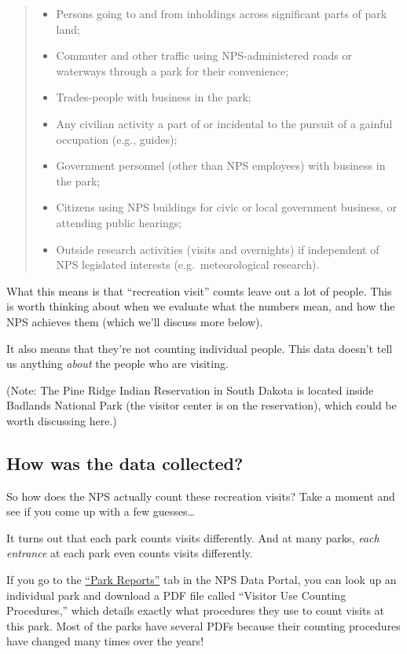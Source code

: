 \documentclass[
  letterpaper,
  DIV=11,
  numbers=noendperiod]{scrartcl}
\providecommand{\tightlist}{%
  \setlength{\itemsep}{0pt}\setlength{\parskip}{0pt}}\usepackage{longtable,booktabs,array}
\begin{document}
\begin{quote}
\begin{itemize}
\tightlist
\item
  Persons going to and from inholdings across significant parts of park
  land;
\item
  Commuter and other traffic using NPS-administered roads or waterways
  through a park for their convenience;
\item
  Trades-people with business in the park;
\item
  Any civilian activity a part of or incidental to the pursuit of a
  gainful occupation (e.g., guides);
\item
  Government personnel (other than NPS employees) with business in the
  park;
\item
  Citizens using NPS buildings for civic or local government business,
  or attending public hearings;
\item
  Outside research activities (visits and overnights) if independent of
  NPS legislated interests (e.g.~meteorological research).
\end{itemize}
\end{quote}

What this means is that ``recreation visit'' counts leave out a lot of
people. This is worth thinking about when we evaluate what the numbers
mean, and how the NPS achieves them (which we'll discuss more below).

It also means that they're not counting individual people. This data
doesn't tell us anything \emph{about} the people who are visiting.

(Note: The Pine Ridge Indian Reservation in South Dakota is located
inside Badlands National Park (the visitor center is on the
reservation), which could be worth discussing here.)

\subsection{How was the data
collected?}\label{how-was-the-data-collected}

So how does the NPS actually count these recreation visits? Take a
moment and see if you come up with a few guesses\ldots{}

It turns out that each park counts visits differently. And at many
parks, \emph{each entrance} at each park even counts visits differently.

If you go to the \href{https://irma.nps.gov/Stats/Reports/Park}{``Park
Reports''} tab in the NPS Data Portal, you can look up an individual
park and download a PDF file called ``Visitor Use Counting Procedures,''
which details exactly what procedures they use to count visits at this
park. Most of the parks have several PDFs because their counting
procedures have changed many times over the years!
\end{document}
